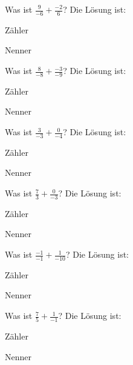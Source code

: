 \documentclass{ximera}
\begin{document}
\begin{shuffle}
\begin{question}
Was ist $\frac{9}{-6} + \frac{-2}{6}$?
Die Lösung ist:
\begin{solution}
Zähler 
\end{solution}
\begin{solution}
Nenner 
\end{solution}
\end{question}


\begin{question}
Was ist $\frac{8}{-8} + \frac{-3}{-9}$?
Die Lösung ist:
\begin{solution}
Zähler 
\end{solution}
\begin{solution}
Nenner 
\end{solution}
\end{question}


\begin{question}
Was ist $\frac{3}{-3} + \frac{0}{-4}$?
Die Lösung ist:
\begin{solution}
Zähler 
\end{solution}
\begin{solution}
Nenner 
\end{solution}
\end{question}


\begin{question}
Was ist $\frac{7}{3} + \frac{0}{-3}$?
Die Lösung ist:
\begin{solution}
Zähler 
\end{solution}
\begin{solution}
Nenner 
\end{solution}
\end{question}


\begin{question}
Was ist $\frac{-1}{-1} + \frac{1}{-10}$?
Die Lösung ist:
\begin{solution}
Zähler 
\end{solution}
\begin{solution}
Nenner 
\end{solution}
\end{question}


\begin{question}
Was ist $\frac{7}{5} + \frac{1}{-1}$?
Die Lösung ist:
\begin{solution}
Zähler 
\end{solution}
\begin{solution}
Nenner 
\end{solution}
\end{question}



\end{shuffle}
\end{document}
